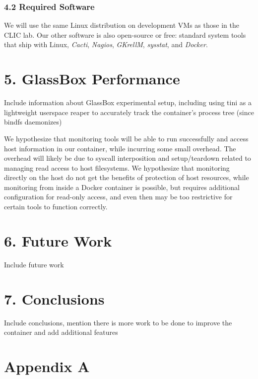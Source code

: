 \documentclass{proc}
\begin{document}
\subsubsection*{4.2 Required Software}

We will use the same Linux distribution on development VMs as those in the CLIC lab. Our other software is also open-source or free: standard system tools that ship with Linux, \textit{Cacti}, \textit{Nagios}, \textit{GKrellM}, \textit{sysstat}, and \textit{Docker}.

\section*{5. GlassBox Performance}

Include information about GlassBox experimental setup, including using tini as a lightweight userspace reaper to accurately track the container's process tree (since bindfs daemonizes)

We hypothesize that monitoring tools will be able to run successfully and access host information in our container, while incurring some small overhead. The overhead will likely be due to syscall interposition and setup/teardown related to managing read access to host filesystems. We hypothesize that monitoring directly on the host do not get the benefits of protection of host resources, while monitoring from inside a Docker container is possible, but requires additional configuration for read-only access, and even then may be too restrictive for certain tools to function correctly.

\section*{6. Future Work}

Include future work

\section*{7. Conclusions}

Include conclusions, mention there is more work to be done to improve the container and add additional features




\clearpage

\section*{Appendix A}

\end{document}
